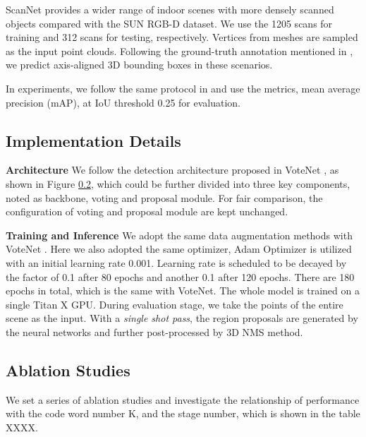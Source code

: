 \documentclass[runningheads]{llncs}
\begin{document}
ScanNet \cite{SCannet} provides a wider range of indoor scenes with more densely scanned objects compared with the SUN RGB-D dataset. We use the  1205 scans for training  and 312 scans  for  testing, respectively.  Vertices from meshes  are sampled as the input point clouds. Following the ground-truth annotation mentioned in \cite{VoteNet}, we predict axis-aligned 3D bounding boxes in these scenarios.

In experiments, we follow the same protocol in \cite{VoteNet} and use the metrics, mean average precision (mAP), at IoU threshold 0.25 for evaluation.

\subsection{Implementation Details} 
\noindent\textbf{Architecture}
We  follow the detection architecture proposed in VoteNet \cite{VoteNet}, as shown in Figure \ref{}, which could be further divided into three key components, noted as  backbone, voting and proposal module. For fair comparison, the configuration of voting and proposal module are kept unchanged. 
 

\noindent\textbf{Training and Inference}
 We adopt the same data augmentation methods with VoteNet \cite{VoteNet} .  Here we also adopted the same optimizer, Adam Optimizer \cite{adam} is utilized with an initial learning rate 0.001. Learning rate is scheduled to be decayed by the factor of 0.1 after 80 epochs and another 0.1 after 120 epochs. There are 180 epochs in total, which is the same with VoteNet\cite{VoteNet}. The whole model is trained on a single Titan X GPU.
During evaluation stage, we take the points of the entire scene as the input. With a \emph{single shot pass}, the region proposals are generated by the neural networks and further post-processed by 3D NMS method.

\subsection{Ablation Studies}
We set a  series of ablation studies and investigate the relationship of performance with the code word number K, and the stage number,  which is shown in the table XXXX. %
\end{document}
